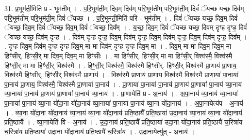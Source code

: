 \documentclass[17pt]{extarticle}
\begin{document}
31. प्र॒भूम॑ती॒मिति॑ प्र - भूम॑तीम् । . प॒रि॒भूम॑ती॒म् दिव॒म् दिव॑म् परि॒भूम॑तीम् परि॒भूम॑ती॒म् दिवं॑ ॅयच्छ यच्छ॒ दिव॑म् परि॒भूम॑तीम् परि॒भूम॑ती॒म् दिवं॑ ॅयच्छ । . प॒रि॒भूम॑ती॒मिति॑ परि - भूम॑तीम् । . दिवं॑ ॅयच्छ यच्छ॒ दिव॒म् दिवं॑ ॅयच्छ॒ दिव॒म् दिवं॑ ॅयच्छ॒ दिव॒म् दिवं॑ ॅयच्छ॒ दिव᳚म् । . य॒च्छ॒ दिव॒म् दिवं॑ ॅयच्छ यच्छ॒ दिव॑म् दृꣳह दृꣳह॒ दिवं॑ ॅयच्छ यच्छ॒ दिव॑म् दृꣳह । . दिव॑म् दृꣳह दृꣳह॒ दिव॒म् दिव॑म् दृꣳह॒ दिव॒म् दिव॑म् दृꣳह॒ दिव॒म् दिव॑म् दृꣳह॒ दिव᳚म् । . दृꣳ॒॒ह॒ दिव॒म् दिव॑म् दृꣳह दृꣳह॒ दिव॒म् मा मा दिव॑म् दृꣳह दृꣳह॒ दिव॒म् मा । . दिव॒म् मा मा दिव॒म् दिव॒म् मा हिꣳ॑सीर्. हिꣳसी॒र् मा दिव॒म् दिव॒म् मा हिꣳ॑सीः । . मा हिꣳ॑सीर्. हिꣳसी॒र् मा मा हिꣳ॑सी॒र् विश्व॑स्मै॒ विश्व॑स्मै हिꣳसी॒र् मा मा हिꣳ॑सी॒र् विश्व॑स्मै । . हिꣳ॒॒सी॒र् विश्व॑स्मै॒ विश्व॑स्मै हिꣳसीर्. हिꣳसी॒र् विश्व॑स्मै प्रा॒णाय॑ प्रा॒णाय॒ विश्व॑स्मै हिꣳसीर्. हिꣳसी॒र् विश्व॑स्मै प्रा॒णाय॑ । . विश्व॑स्मै प्रा॒णाय॑ प्रा॒णाय॒ विश्व॑स्मै॒ विश्व॑स्मै प्रा॒णाया॑ पा॒नाया॑ पा॒नाय॑ प्रा॒णाय॒ विश्व॑स्मै॒ विश्व॑स्मै प्रा॒णाया॑ पा॒नाय॑ । . प्रा॒णाया॑ पा॒नाया॑ पा॒नाय॑ प्रा॒णाय॑ प्रा॒णाया॑ पा॒नाय॑ व्या॒नाय॑ व्या॒नाया॑ पा॒नाय॑ प्रा॒णाय॑ प्रा॒णाया॑ पा॒नाय॑ व्या॒नाय॑ । . प्रा॒णायेति॑ प्र - अ॒नाय॑ । . अ॒पा॒नाय॑ व्या॒नाय॑ व्या॒नाया॑ पा॒नाया॑ पा॒नाय॑ व्या॒ना यो॑दा॒ना यो॑दा॒नाय॑ व्या॒नाया॑ पा॒नाया॑ पा॒नाय॑ व्या॒ना यो॑दा॒नाय॑ । . अ॒पा॒नायेत्य॑प - अ॒नाय॑ । . व्या॒ना यो॑दा॒ना यो॑दा॒नाय॑ व्या॒नाय॑ व्या॒ना यो॑दा॒नाय॑ प्रति॒ष्ठायै᳚ प्रति॒ष्ठाया॑ उदा॒नाय॑ व्या॒नाय॑ व्या॒ना यो॑दा॒नाय॑ प्रति॒ष्ठायै᳚ । . व्या॒नायेति॑ वि - अ॒नाय॑ । . उ॒दा॒नाय॑ प्रति॒ष्ठायै᳚ प्रति॒ष्ठाया॑ उदा॒ना यो॑दा॒नाय॑ प्रति॒ष्ठायै॑ च॒रित्रा॑य च॒रित्रा॑य प्रति॒ष्ठाया॑ उदा॒ना यो॑दा॒नाय॑ प्रति॒ष्ठायै॑ च॒रित्रा॑य । . उ॒दा॒नायेत्यु॑त् - अ॒नाय॑ । \newline
\end{document}
